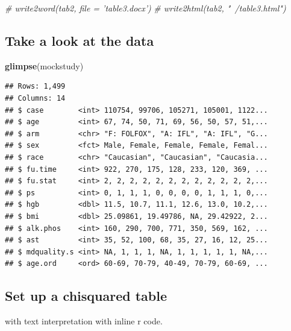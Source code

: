 \documentclass[
]{book}
\newenvironment{Shaded}{\begin{snugshade}}{\end{snugshade}}
\newcommand{\CommentTok}[1]{\textcolor[rgb]{0.56,0.35,0.01}{\textit{#1}}}
\newcommand{\KeywordTok}[1]{\textcolor[rgb]{0.13,0.29,0.53}{\textbf{#1}}}
\newcommand{\NormalTok}[1]{#1}
\newcommand{\OperatorTok}[1]{\textcolor[rgb]{0.81,0.36,0.00}{\textbf{#1}}}
\newcommand{\StringTok}[1]{\textcolor[rgb]{0.31,0.60,0.02}{#1}}
\begin{document}
\begin{Shaded}
\begin{Highlighting}[]
\CommentTok{# write2word(tab2, file = 'table3.docx')}
\CommentTok{# write2html(tab2, "~/table3.html")}
\end{Highlighting}
\end{Shaded}

\hypertarget{take-a-look-at-the-data-1}{%
\subsection{Take a look at the data}\label{take-a-look-at-the-data-1}}

\begin{Shaded}
\begin{Highlighting}[]
\KeywordTok{glimpse}\NormalTok{(mockstudy)}
\end{Highlighting}
\end{Shaded}

\begin{verbatim}
## Rows: 1,499
## Columns: 14
## $ case        <int> 110754, 99706, 105271, 105001, 1122...
## $ age         <int> 67, 74, 50, 71, 69, 56, 50, 57, 51,...
## $ arm         <chr> "F: FOLFOX", "A: IFL", "A: IFL", "G...
## $ sex         <fct> Male, Female, Female, Female, Femal...
## $ race        <chr> "Caucasian", "Caucasian", "Caucasia...
## $ fu.time     <int> 922, 270, 175, 128, 233, 120, 369, ...
## $ fu.stat     <int> 2, 2, 2, 2, 2, 2, 2, 2, 2, 2, 2, 2,...
## $ ps          <int> 0, 1, 1, 1, 0, 0, 0, 0, 1, 1, 1, 0,...
## $ hgb         <dbl> 11.5, 10.7, 11.1, 12.6, 13.0, 10.2,...
## $ bmi         <dbl> 25.09861, 19.49786, NA, 29.42922, 2...
## $ alk.phos    <int> 160, 290, 700, 771, 350, 569, 162, ...
## $ ast         <int> 35, 52, 100, 68, 35, 27, 16, 12, 25...
## $ mdquality.s <int> NA, 1, 1, 1, NA, 1, 1, 1, 1, 1, NA,...
## $ age.ord     <ord> 60-69, 70-79, 40-49, 70-79, 60-69, ...
\end{verbatim}

\hypertarget{set-up-a-chisquared-table-1}{%
\subsection{Set up a chisquared table}\label{set-up-a-chisquared-table-1}}

with text interpretation with inline r code.

\begin{Shaded}
\end{Shaded}
\end{document}
